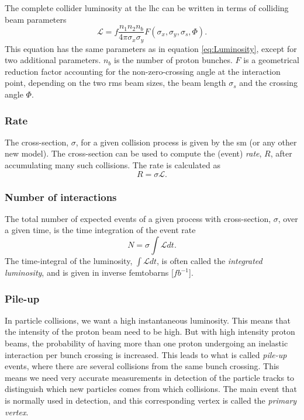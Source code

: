 \documentclass[a4paper, american, 12pt]{report}
\begin{document}
	The complete collider luminosity at the \acrshort{lhc} can be written in terms of colliding beam parameters \cite{atlasLuminosity}
	\begin{equation}
	\label{eq:Luminosity_comp}
		\mathcal{L}=f\frac{n_1n_2n_b}{4\pi \sigma_x \sigma_y} F(\sigma_x,\sigma_y,\sigma_s,\Phi).
	\end{equation}
	This equation has the same parameters as in equation \ref{eq:Luminosity}, except for two additional parameters. $n_b$ is the number of proton bunches. $F$ is a geometrical reduction factor accounting for the non-zero-crossing angle at the interaction point, depending on the two rms beam sizes, the beam length $\sigma_s$ and the crossing angle $\Phi$.
	
	
	\subsubsection{Rate}
	\label{subsubsect:Theory-Rate}
	The cross-section, $\sigma$, for a given collision process is given by the \acrshort{sm} (or any other new model). The cross-section can be used to compute the (event) \textit{rate}, $R$, after accumulating many such collisions. The rate is calculated as
	\begin{equation}
	\label{eq:Rate}
	 	R=\sigma\mathcal{L}.
	\end{equation}
	
	
	\subsubsection{Number of interactions}
	\label{subsubsect:Theory-No_interaction}
	The total number of expected events of a given process with cross-section, $\sigma$,  over a given time, is the time integration of the event rate
	\begin{equation}
	\label{eq:No_int}
		N=\sigma\int\mathcal{L} dt.
	\end{equation}
	The time-integral of the luminosity, $\int\mathcal{L}dt$, is often called the \textit{integrated luminosity}, and is given in inverse femtobarns [$fb^{-1}$]. 
	
	
	\subsubsection{Pile-up}
	\label{subsubsect:Theory-Pileup}
	In particle collisions, we want a high instantaneous luminosity. This means that the intensity of the proton beam need to be high. But with high intensity proton beams, the probability of having more than one proton undergoing an inelastic interaction per bunch crossing is increased. This leads to what is called \textit{pile-up} events, where there are several collisions from the same bunch crossing. This means we need very accurate measurements in detection of the particle tracks to distinguish which new particles comes from which collisions. The main event that is normally used in detection, and this corresponding vertex is called the \textit{primary vertex}. 
	
\end{document}
